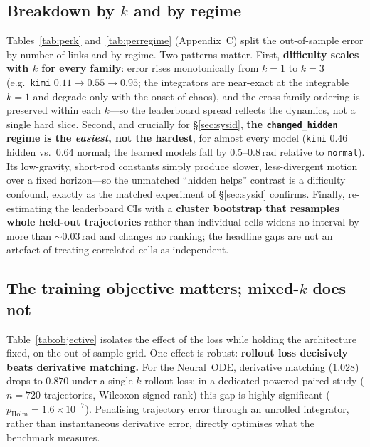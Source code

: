 \documentclass{article}
\begin{document}
\subsection{Breakdown by $k$ and by regime}
\label{sec:breakdown}
Tables~\ref{tab:perk} and~\ref{tab:perregime} (Appendix~C) split the out-of-sample error
by number of links and by regime. Two patterns matter. First, \textbf{difficulty scales
with $k$ for every family}: error rises monotonically from $k{=}1$ to $k{=}3$ (e.g.\
\texttt{kimi} $0.11\to0.55\to0.95$; the integrators are near-exact at the integrable
$k{=}1$ and degrade only with the onset of chaos), and the cross-family ordering is
preserved within each $k$---so the leaderboard spread reflects the dynamics, not a single
hard slice. Second, and crucially for \S\ref{sec:sysid}, \textbf{the
\texttt{changed\_hidden} regime is the \emph{easiest}, not the hardest}, for almost every
model (\texttt{kimi} $0.46$ hidden vs.\ $0.64$ normal; the learned models fall by
$0.5$--$0.8$\,rad relative to \texttt{normal}). Its low-gravity, short-rod constants
simply produce slower, less-divergent motion over a fixed horizon---so the unmatched
``hidden helps'' contrast is a difficulty confound, exactly as the matched experiment of
\S\ref{sec:sysid} confirms. Finally, re-estimating the leaderboard CIs with a
\textbf{cluster bootstrap that resamples whole held-out trajectories} rather than
individual cells widens no interval by more than ${\sim}0.03$\,rad and changes no ranking;
the headline gaps are not an artefact of treating correlated cells as independent.

\subsection{The training objective matters; mixed-$k$ does not}
\label{sec:objective}
Table~\ref{tab:objective} isolates the effect of the loss while holding the
architecture fixed, on the out-of-sample grid. One effect is robust: \textbf{rollout
loss decisively beats derivative matching.} For the Neural~ODE, derivative matching
($1.028$) drops to $0.870$ under a single-$k$ rollout loss; in a dedicated powered
paired study ($n{=}720$ trajectories, Wilcoxon signed-rank) this gap is highly
significant ($p_{\mathrm{Holm}}{=}1.6{\times}10^{-7}$). Penalising trajectory error
through an unrolled integrator, rather than instantaneous derivative error, directly
optimises what the benchmark measures.
\end{document}
